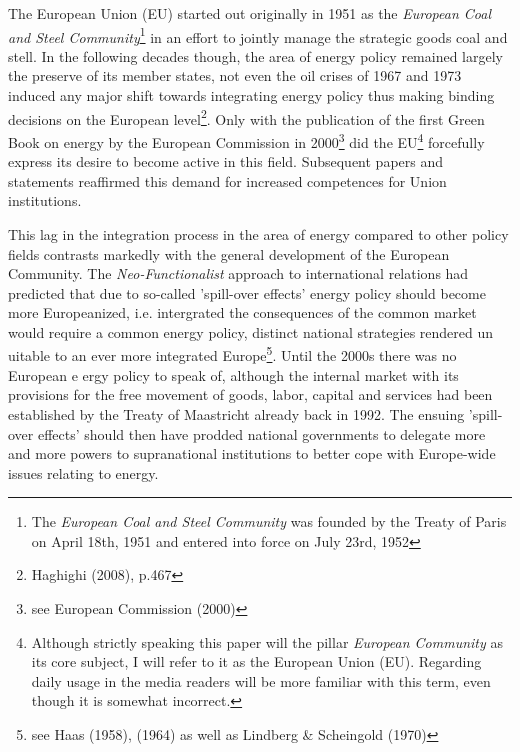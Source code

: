 \documentclass[11pt,a4paper,english]{scrreprt}
\begin{document}
The European Union (EU) started out originally in 1951 as the
\textsl{European Coal and Steel Community}\footnote{The \emph{European Coal and
Steel Community} was founded by the Treaty of Paris on April 18th, 1951 and
entered into force on July 23rd, 1952} in an effort to jointly manage
the strategic goods coal and stell. In the following decades though, the area
of energy policy remained largely the preserve of its member states, not
even the oil crises of 1967 and 1973 induced any major shift towards integrating
energy policy thus making binding decisions on the European
level\footnote{Haghighi (2008), p.467}. Only with the publication of the first
Green Book on energy by the European Commission in 2000\footnote{see European
Commission (2000)} did the EU\footnote{Although strictly speaking this paper
will the pillar \emph{European Community} as its core subject, I will refer to
it as the European Union (EU). Regarding daily usage in the media readers will
be more familiar with this term, even though it is somewhat incorrect.}
forcefully express its desire to become active in this field. Subsequent
papers and statements reaffirmed this demand for increased competences for Union
institutions.\par

This lag in the integration process in the area of energy compared to other
policy fields contrasts markedly with the general development of the European
Community. The \emph{Neo-Functionalist} approach to international relations had
predicted that due to so-called 'spill-over effects' energy policy should become
more Europeanized, i.e. intergrated \textemdash{} the consequences of the common
market would require a common energy policy, distinct national strategies
rendered un uitable to an ever more integrated Europe\footnote{see Haas (1958),
(1964) as well as Lindberg \& Scheingold (1970)}. Until the 2000s there was no
European e ergy policy to speak of, although the internal market with its
provisions for the free movement of goods, labor, capital and services had been 
established by the Treaty of Maastricht already back in 1992. The ensuing
'spill-over effects' should then have prodded national governments to delegate
more and more powers to supranational institutions to better cope with
Europe-wide issues relating to energy.\par 
\end{document}
